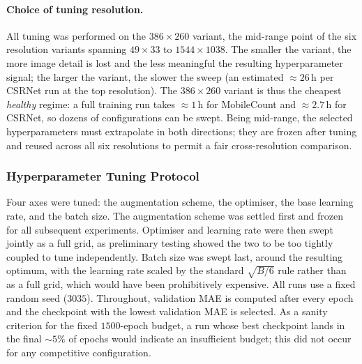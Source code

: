 \documentclass[conference]{IEEEtran}
\begin{document}
\paragraph{Choice of tuning resolution.}
All tuning was performed on the $386\times260$ variant, the mid-range point of the six resolution variants spanning $49\times33$ to $1544\times1038$. The smaller the variant, the more image detail is lost and the less meaningful the resulting hyperparameter signal; the larger the variant, the slower the sweep (an estimated ${\approx}26$\,h per CSRNet run at the top resolution). The $386\times260$ variant is thus the cheapest \emph{healthy} regime: a full training run takes
${\approx}1$\,h for MobileCount and ${\approx}2.7$\,h for CSRNet, so dozens of configurations can be swept. Being mid-range, the selected hyperparameters must extrapolate in both directions; they are frozen after tuning and reused across all six resolutions to permit a fair cross-resolution comparison.

\subsubsection{Hyperparameter Tuning Protocol}
\label{sec:tuning_protocol}
Four axes were tuned: the augmentation scheme, the optimiser, the base
learning rate, and the batch size. The augmentation scheme was settled
first and frozen for all subsequent experiments. Optimiser and
learning rate were then swept jointly as a full grid, as preliminary
testing showed the two to be too tightly coupled to tune
independently. Batch size was swept last, around the resulting
optimum, with the learning rate scaled by the standard $\sqrt{B/6}$
rule rather than as a full grid, which would have been prohibitively
expensive. All runs use a fixed random seed ($3035$). Throughout,
validation MAE is computed after every epoch and the checkpoint with
the lowest validation MAE is selected. As a sanity criterion for the
fixed $1500$-epoch budget, a run whose best checkpoint lands in the
final ${\sim}5\%$ of epochs would indicate an insufficient budget;
this did not occur for any competitive configuration.
\end{document}
